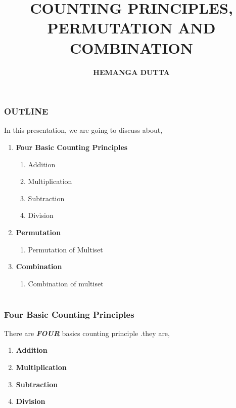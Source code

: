 \documentclass{beamer}
\title{COUNTING PRINCIPLES, PERMUTATION AND COMBINATION}
\author{ \bf  HEMANGA DUTTA}
\date{\hspace{8cm} }
\begin{document}
\begin{frame}
 \maketitle 
\end{frame}


\section{}
\begin{frame}
\frametitle{OUTLINE} 
In this presentation, we are going to discuss about, 
\begin{enumerate}
\item {\bf Four Basic Counting Principles} 
    \begin{enumerate}
      \item Addition
      \item Multiplication
\item Subtraction
\item Division{\vspace{.5cm}}
\end{enumerate}
\item {\bf Permutation}
    \begin{enumerate}
\item Permutation of Multiset{\vspace{.5cm}}
\end{enumerate}
\item {\bf Combination}
 \begin{enumerate}
\item Combination of multiset 
\end{enumerate}
\end{enumerate}

\end{frame}

\section{}
\begin{frame}
\frametitle{Four Basic Counting Principles} 
There are {\it \bf FOUR} basics counting principle .they are,{\vspace{.5cm}}
    \begin{enumerate}
\item {\Large \bf  Addition} {\vspace{.5cm}}
\item {\Large \bf  Multiplication}{\vspace{.5cm}}
\item {\Large \bf  Subtraction}{\vspace{.5cm}}
\item {\Large \bf Division }
\end{enumerate}
  
\end{frame}
\end{document}
